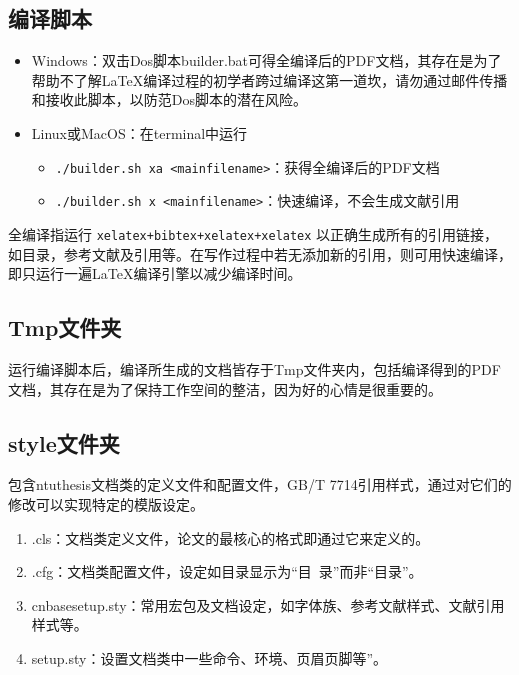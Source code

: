 \subsection{编译脚本}

\begin{itemize}
    \item Windows：双击Dos脚本builder.bat可得全编译后的PDF文档，其存在是为了帮助不了解\LaTeX{}编译过程的初学者跨过编译这第一道坎，请勿通过邮件传播和接收此脚本，以防范Dos脚本的潜在风险。
    \item Linux或MacOS：在terminal中运行
        \begin{itemize}
            \item \verb|./builder.sh xa <mainfilename>|：获得全编译后的PDF文档
            \item \verb|./builder.sh x <mainfilename>|：快速编译，不会生成文献引用
        \end{itemize}
\end{itemize}

全编译指运行 \verb|xelatex+bibtex+xelatex+xelatex| 以正确生成所有的引用链接，如目录，参考文献及引用等。在写作过程中若无添加新的引用，则可用快速编译，即只运行一遍\LaTeX{}编译引擎以减少编译时间。

\subsection{Tmp文件夹}

运行编译脚本后，编译所生成的文档皆存于Tmp文件夹内，包括编译得到的PDF文档，其存在是为了保持工作空间的整洁，因为好的心情是很重要的。

\subsection{style文件夹}

包含ntuthesis文档类的定义文件和配置文件，GB/T 7714引用样式，通过对它们的修改可以实现特定的模版设定。

\begin{enumerate}
    \item \projectname.cls：文档类定义文件，论文的最核心的格式即通过它来定义的。
    \item \projectname.cfg：文档类配置文件，设定如目录显示为“目~录”而非“目录”。
    \item cnbasesetup.sty：常用宏包及文档设定，如字体族、参考文献样式、文献引用样式等。
    \item \projectname setup.sty：设置文档类中一些命令、环境、页眉页脚等”。
\end{enumerate}


